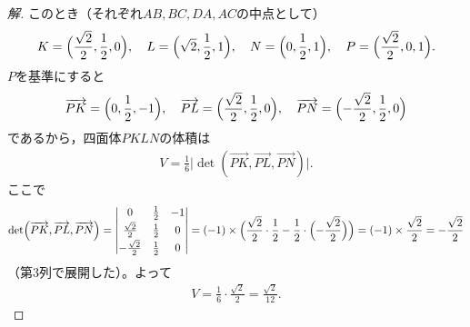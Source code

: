 \documentclass[../main.tex]{subfiles}
\begin{document}
\begin{proof}[解]
  このとき（それぞれ$AB,BC,DA,AC$の中点として）
  \begin{align*}
    K=\Bigl(\frac{\sqrt2}2,\frac12,0\Bigr),\quad L=\Bigl(\sqrt2,\frac12,1\Bigr),\quad N=\Bigl(0,\frac12,1\Bigr),\quad P=\Bigl(\frac{\sqrt2}2,0,1\Bigr).
  \end{align*}
  $P$を基準にすると
  \begin{align*}
    \overrightarrow{PK}=\Bigl(0,\frac12,-1\Bigr),\quad \overrightarrow{PL}=\Bigl(\frac{\sqrt2}2,\frac12,0\Bigr),\quad\overrightarrow{PN}=\Bigl(-\frac{\sqrt2}2,\frac12,0\Bigr)
  \end{align*}
  であるから，四面体$PKLN$の体積は
  \begin{align*}
    V=\frac16\bigl|\det(\overrightarrow{PK},\overrightarrow{PL},\overrightarrow{PN})\bigr|.
  \end{align*}
  ここで
  \begin{align*}
    \det(\overrightarrow{PK},\overrightarrow{PL},\overrightarrow{PN})
    =
    \begin{vmatrix}0&\frac12&-1\\[2pt]\frac{\sqrt2}2&\frac12&0\\[2pt]-\frac{\sqrt2}2&\frac12&0
    \end{vmatrix}
    =(-1)\times\Bigl(\frac{\sqrt2}2\cdot\frac12-\frac12\cdot\Bigl(-\frac{\sqrt2}2\Bigr)\Bigr)=(-1)\times\frac{\sqrt2}2=-\frac{\sqrt2}2
  \end{align*}
  （第3列で展開した）。よって
  \begin{align*}
    V=\frac16\cdot\frac{\sqrt2}2=\frac{\sqrt2}{12}.
  \end{align*}
\end{proof}
\end{document}
